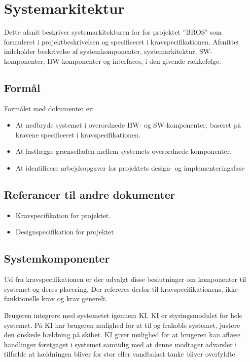 \section{Systemarkitektur}
Dette afsnit beskriver systemarkitekturen for for projektet ”BROS" som formuleret i projektbeskrivelsen og specificeret i kravspecifikationen.
Afsnittet indeholder beskrivelse af systemkomponenter, systemarkitektur, SW-komponenter, HW-komponenter og interfaces, i den givende rækkefølge.

\subsection{Formål}
Formålet med dokumentet er:
\begin{itemize}
\item At nedbryde systemet i overordnede HW- og SW-komponenter, baseret på kravene specificeret i kravspecifikationen.
\item At fastlægge grænsefladen mellem systemets overordnede komponenter.
\item At identificere arbejdsopgaver for projektets design- og implementeringsfase
\end{itemize}

\subsection{Referancer til andre dokumenter}
\begin{itemize}
\item Kravspecifikation for projektet.
\item Designspecifikation for projektet
\end{itemize}

\subsection{Systemkomponenter}
Ud fra kravspecifikationen er der udvalgt disse beslutninger om komponenter til systemet og deres placering. Der refereres derfor til kravspecifikationens, ikke-funktionelle krav og krav generelt.

Brugeren integrere med systemetet igennem KI. KI er styringsmodulet for hele systemet. På KI har brugeren mulighed for at til og frakoble systemet, justere den ønskede hældning på skibet. KI giver mulighed for at brugeren kan aflæse handlinger foretgaget i systemet samtidig med at denne modtager advarsler i tilfælde at hældningen bliver for stor eller vandbalast tanke bliver overfyldte